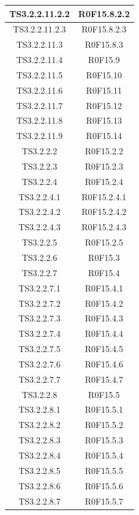 \documentclass[../PianoDiQualifica.tex]{subfiles}
\begin{document}
\begin{longtable}{|c|c|}
		\hline
		TS3.2.2.11.2.2 & R0F15.8.2.2   \\
		\hline
		TS3.2.2.11.2.3 & R0F15.8.2.3   \\
		\hline
		TS3.2.2.11.3 & R0F15.8.3   \\
		\hline
		TS3.2.2.11.4 & R0F15.9   \\
		\hline
		TS3.2.2.11.5 & R0F15.10   \\
		\hline
		TS3.2.2.11.6 & R0F15.11   \\
		\hline
		TS3.2.2.11.7 & R0F15.12   \\
		\hline
		TS3.2.2.11.8 & R0F15.13   \\
		\hline
		TS3.2.2.11.9 & R0F15.14   \\
		\hline
		TS3.2.2.2 & R0F15.2.2   \\
		\hline
		TS3.2.2.3 & R0F15.2.3   \\
		\hline
		TS3.2.2.4 & R0F15.2.4   \\
		\hline
		TS3.2.2.4.1 & R0F15.2.4.1   \\
		\hline
		TS3.2.2.4.2 & R0F15.2.4.2   \\
		\hline
		TS3.2.2.4.3 & R0F15.2.4.3   \\
		\hline
		TS3.2.2.5 & R0F15.2.5   \\
		\hline
		TS3.2.2.6 & R0F15.3   \\
		\hline
		TS3.2.2.7 & R0F15.4   \\
		\hline
		TS3.2.2.7.1 & R0F15.4.1   \\
		\hline
		TS3.2.2.7.2 & R0F15.4.2   \\
		\hline
		TS3.2.2.7.3 & R0F15.4.3   \\
		\hline
		TS3.2.2.7.4 & R0F15.4.4   \\
		\hline
		TS3.2.2.7.5 & R0F15.4.5   \\
		\hline
		TS3.2.2.7.6 & R0F15.4.6   \\
		\hline
		TS3.2.2.7.7 & R0F15.4.7   \\
		\hline
		TS3.2.2.8 & R0F15.5   \\
		\hline
		TS3.2.2.8.1 & R0F15.5.1   \\
		\hline
		TS3.2.2.8.2 & R0F15.5.2   \\
		\hline
		TS3.2.2.8.3 & R0F15.5.3   \\
		\hline
		TS3.2.2.8.4 & R0F15.5.4   \\
		\hline
		TS3.2.2.8.5 & R0F15.5.5   \\
		\hline
		TS3.2.2.8.6 & R0F15.5.6   \\
		\hline
		TS3.2.2.8.7 & R0F15.5.7   \\

\end{longtable}
\end{document}
